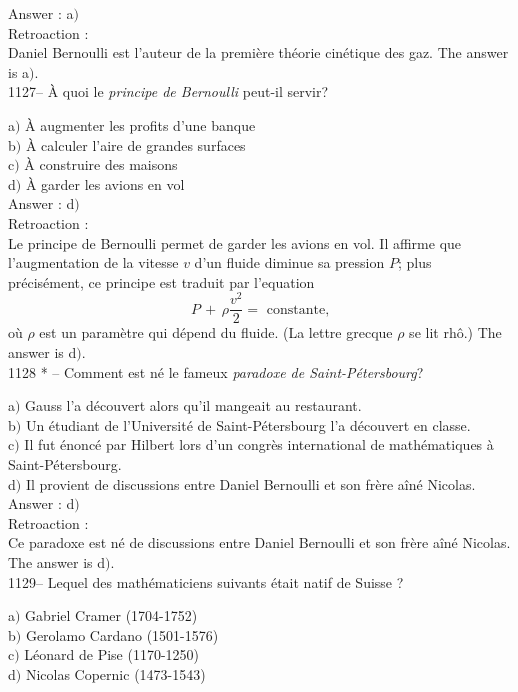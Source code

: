 ﻿\documentclass[letterpaper, 12pt]{article}
\begin{document}
Answer : a$)$\\

Retroaction : \\
Daniel Bernoulli est l'auteur de la premi\`ere th\'eorie cin\'etique
des gaz.
The answer is a$)$.\\

1127-- \`A quoi le {\sl principe de Bernoulli} peut-il servir?

a$)$ \`A augmenter les profits d'une banque \\
b$)$ \`A calculer l'aire de grandes surfaces \\
c$)$ \`A construire des maisons \\
d$)$ \`A garder les avions en vol \\

Answer : d$)$\\

Retroaction : \\
Le principe de Bernoulli permet de garder les avions en vol. Il
affirme que l'augmentation de la vitesse $v$ d'un fluide diminue sa
pression $P$; plus pr\'ecis\'ement, ce principe est traduit par
l'equation
$$\displaystyle{P\,+\,\rho\frac{v^2}2= \text{ constante,}}$$
o\`u $\rho$ est un param\`etre qui d\'epend du fluide. (La lettre
grecque $\rho$ se lit rh\^o.)
The answer is d$)$.\\

1128 * -- Comment est n\'e le fameux {\sl paradoxe de
Saint-P\'etersbourg}?

a$)$ Gauss l'a d\'ecouvert alors qu'il mangeait au restaurant. \\
b$)$ Un \'etudiant de l'Universit\'e de Saint-P\'etersbourg l'a d\'ecouvert
en classe. \\
c$)$ Il fut \'enonc\'e par Hilbert lors d'un congr\`es international de
math\'ematiques \`a Saint-P\'etersbourg.\\
d$)$ Il provient de discussions entre Daniel Bernoulli et son fr\`ere
a\^in\'e Nicolas.\\

Answer : d$)$\\

Retroaction : \\
Ce paradoxe est n\'e de discussions entre Daniel Bernoulli et son
fr\`ere a\^in\'e Nicolas.
The answer is d$)$.\\

1129-- Lequel des math\'ematiciens suivants \'etait natif de Suisse
?

a$)$ Gabriel Cramer (1704-1752) \\
b$)$ Gerolamo Cardano (1501-1576) \\
c$)$ L\'eonard de Pise (1170-1250) \\
d$)$ Nicolas Copernic (1473-1543)\\
\end{document}
